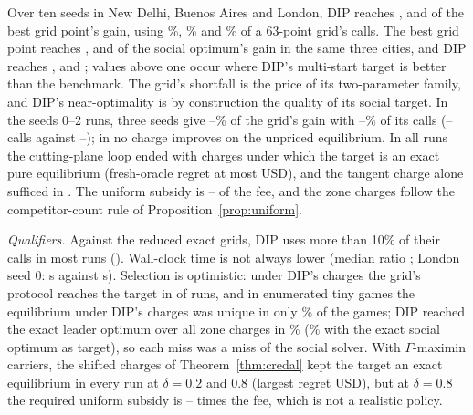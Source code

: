 \documentclass[preprint,11pt]{elsarticle}
\theoremstyle{definition}
\theoremstyle{remark}
\begin{document}
\begin{table}[tbp]\centering\small
\caption{Leader methods, mean over seeds (exact oracle). DIP / grid: DIP gain over the best exact grid point's gain; calls: DIP's oracle calls as a percentage of a 63-point grid at the same calls per point. Gain shares against the social optimum (SO): best grid point, DIP, ARP flat; ARP / DIP gain ratio; $n_{\rm ARP}$ seeds with an ARP run. $^*$: reduced exact grid (lower bounds for the grid column). Shares are not reported where the optimum's gain is below 0.5\% of $|$social cost$|$.}\label{tab:seeds10b}
\end{table}

Over ten seeds in New Delhi, Buenos Aires and London, DIP reaches \TenDipGridNewDelhi, \TenDipGridBuenosAires{} and \TenDipGridLondon{} of the best grid point's gain, using \TenDipCallsNewDelhi\%, \TenDipCallsBuenosAires\% and \TenDipCallsLondon\% of a 63-point grid's calls. The best grid point reaches \TenSoGridNewDelhi, \TenSoGridBuenosAires{} and \TenSoGridLondon{} of the social optimum's gain in the same three cities, and DIP reaches \TenSoDipNewDelhi, \TenSoDipBuenosAires{} and \TenSoDipLondon; values above one occur where DIP's multi-start target is better than the benchmark. The grid's shortfall is the price of its two-parameter family, and DIP's near-optimality is by construction the quality of its social target. In the seeds 0--2 runs, three seeds give \DipFullGainMin--\DipFullGainMax\% of the grid's gain with \DipFullCallsMin--\DipFullCallsMax\% of its calls (\DipCallsFullMin--\DipCallsFullMax{} calls against \GridCallsFullMin--\GridCallsFullMax); in \DipNoGainCities{} no charge improves on the unpriced equilibrium. In all \DipRuns{} runs the cutting-plane loop ended with charges under which the target is an exact pure equilibrium (fresh-oracle regret at most \DipRegretMax{} USD), and the tangent charge alone sufficed in \DipTangentN. The uniform subsidy is \DipSubsMin--\DipSubsMax{} of the fee, and the zone charges follow the competitor-count rule of Proposition~\ref{prop:uniform}.

\emph{Qualifiers.} Against the reduced exact grids, DIP uses more than 10\% of their calls in most runs (\DipRedCalls). Wall-clock time is not always lower (median ratio \DipTimeMed; London seed 0: \DipLondonTime{} s against \DipLondonGridTime{} s). Selection is optimistic: under DIP's charges the grid's protocol reaches the target in \DipSelSame{} of \DipRuns{} runs, and in \DipTinyN{} enumerated tiny games the equilibrium under DIP's charges was unique in only \DipTinyUniquePct\% of the games; DIP reached the exact leader optimum over all zone charges in \DipTinyHitPct\% (\DipTinyHitXPct\% with the exact social optimum as target), so each miss was a miss of the social solver. With $\Gamma$-maximin carriers, the shifted charges of Theorem~\ref{thm:credal} kept the target an exact equilibrium in every run at $\delta=0.2$ and $0.8$ (largest regret \DipCredalRegret{} USD), but at $\delta=0.8$ the required uniform subsidy is \DipCredalSubMin--\DipCredalSubMax{} times the fee, which is not a realistic policy.
\end{document}
